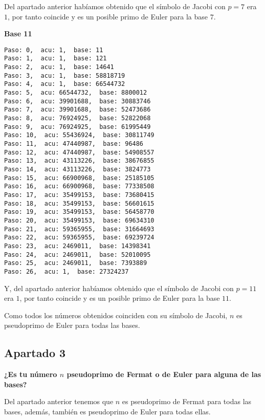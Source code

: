 \documentclass[a4paper]{article}
\begin{document}
Del apartado anterior habíamos obtenido que el símbolo de Jacobi con $p=7$ era $1$, por tanto coincide y es un posible primo de Euler para la base $7$.

\textbf{Base 11}
\begin{verbatim}
Paso: 0,  acu: 1,  base: 11  
Paso: 1,  acu: 1,  base: 121  
Paso: 2,  acu: 1,  base: 14641  
Paso: 3,  acu: 1,  base: 58818719  
Paso: 4,  acu: 1,  base: 66544732  
Paso: 5,  acu: 66544732,  base: 8800012  
Paso: 6,  acu: 39901688,  base: 30883746  
Paso: 7,  acu: 39901688,  base: 52473686  
Paso: 8,  acu: 76924925,  base: 52822068  
Paso: 9,  acu: 76924925,  base: 61995449  
Paso: 10,  acu: 55436924,  base: 30811749  
Paso: 11,  acu: 47440987,  base: 96486  
Paso: 12,  acu: 47440987,  base: 54908557  
Paso: 13,  acu: 43113226,  base: 38676855  
Paso: 14,  acu: 43113226,  base: 3824773  
Paso: 15,  acu: 66900968,  base: 25185105  
Paso: 16,  acu: 66900968,  base: 77338508  
Paso: 17,  acu: 35499153,  base: 73680415  
Paso: 18,  acu: 35499153,  base: 56601615  
Paso: 19,  acu: 35499153,  base: 56458770  
Paso: 20,  acu: 35499153,  base: 69634310  
Paso: 21,  acu: 59365955,  base: 31664693  
Paso: 22,  acu: 59365955,  base: 69239724  
Paso: 23,  acu: 2469011,  base: 14398341  
Paso: 24,  acu: 2469011,  base: 52010095  
Paso: 25,  acu: 2469011,  base: 7393889  
Paso: 26,  acu: 1,  base: 27324237 
\end{verbatim}

Y, del apartado anterior habíamos obtenido que el símbolo de Jacobi con $p=11$ era $1$, por tanto coincide y es un posible primo de Euler para la base $11$.

Como todos los números obtenidos coinciden con su símbolo de Jacobi, $n$ es pseudoprimo de Euler para todas las bases.

\subsection{Apartado 3}

\textbf{¿Es tu número $n$ pseudoprimo de Fermat o de Euler para alguna de las bases?}

Del apartado anterior tenemos que $n$ es pseudoprimo de Fermat para todas las bases, además, también es pseudoprimo de Euler para todas ellas.
\end{document}
